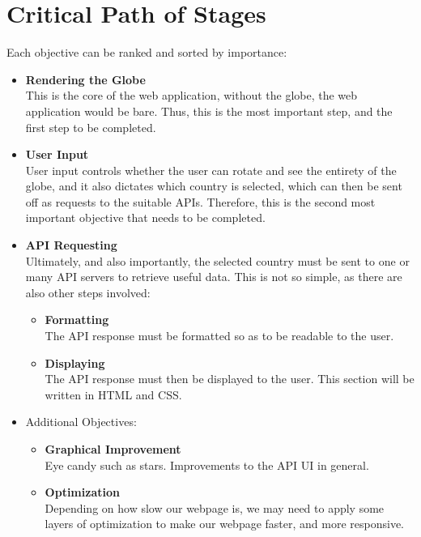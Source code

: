 \section{Critical Path of Stages}
Each objective can be ranked and sorted by importance:
\begin{itemize}
    \item \textbf{Rendering the Globe} \\
        This is the core of the web application, without the globe, the web application would be bare. Thus, this is the most important step, and the first step to be completed.
    \item \textbf{User Input} \\
        User input controls whether the user can rotate and see the entirety of the globe, and it also dictates which country is selected, which can then be sent off as requests to the suitable APIs. Therefore, this is the second most important objective that needs to be completed.
    \item \textbf{API Requesting} \\
        Ultimately, and also importantly, the selected country must be sent to one or many API servers to retrieve useful data. This is not so simple, as there are also other steps involved:
        \begin{itemize}
            \item \textbf{Formatting} \\
                The API response must be formatted so as to be readable to the user.
            \item \textbf{Displaying} \\
                The API response must then be displayed to the user. This section will be written in HTML and CSS.
        \end{itemize}
    \item Additional Objectives:
        \begin{itemize}
            \item \textbf{Graphical Improvement} \\
                Eye candy such as stars. Improvements to the API UI in general.
            \item \textbf{Optimization} \\
                Depending on how slow our webpage is, we may need to apply some layers of optimization to make our webpage faster, and more responsive.
        \end{itemize}
\end{itemize}

